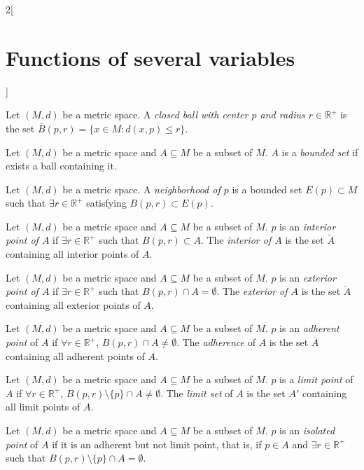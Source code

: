 \documentclass[../../../main.tex]{subfiles}
\begin{document}
\begin{multicols}{2}[\section{Functions of several variables}]
\begin{definition}
Let $(M,d)$ be a metric space. A \textit{closed ball with center $p$ and radius $r\in\mathbb{R}^+$} is the set $\overline{B}(p,r)=\{x\in M:d(x,p)\leq r\}$.
\end{definition}
\begin{definition}
Let $(M,d)$ be a metric space and $A\subseteq M$ be a subset of $M$. $A$ is a \textit{bounded set} if exists a ball containing it.
\end{definition}
\begin{definition}
Let $(M,d)$ be a metric space. A \textit{neighborhood of $p$} is a bounded set $E(p)\subset M$ such that $\exists r\in\mathbb{R}^+$ satisfying $B(p,r)\subset E(p)$.
\end{definition}
\begin{definition}
Let $(M,d)$ be a metric space and $A\subseteq M$ be a subset of $M$. $p$ is an \textit{interior point of $A$} if $\exists r\in\mathbb{R}^+$ such that $B(p,r)\subset A$. The \textit{interior of $A$} is the set $\mathring A$ containing all interior points of $A$.
\end{definition}
\begin{definition}
Let $(M,d)$ be a metric space and $A\subseteq M$ be a subset of $M$. $p$ is an \textit{exterior point of $A$} if $\exists r\in\mathbb{R}^+$ such that $B(p,r)\cap A=\emptyset$. The \textit{exterior of $A$} is the set $\mathring A$ containing all exterior points of $A$.
\end{definition}
\begin{definition}
Let $(M,d)$ be a metric space and $A\subseteq M$ be a subset of $M$. $p$ is an \textit{adherent point} of $A$ if $\forall r\in\mathbb{R}^+$, $B(p,r)\cap A\ne\emptyset$. The \textit{adherence} of $A$ is the set $\overline{A}$ containing all adherent points of $A$.
\end{definition}
\begin{definition}
Let $(M,d)$ be a metric space and $A\subseteq M$ be a subset of $M$. $p$ is a \textit{limit point} of $A$ if $\forall r\in\mathbb{R}^+$, $B(p,r)\setminus\{p\}\cap A\ne\emptyset$. The \textit{limit set} of $A$ is the set $A'$ containing all limit points of $A$.
\end{definition}
\begin{definition}
Let $(M,d)$ be a metric space and $A\subseteq M$ be a subset of $M$. $p$ is an \textit{isolated point} of $A$ if it is an adherent but not limit point, that is, if $p\in A$ and $\exists r\in\mathbb{R}^+$ such that $B(p,r)\setminus\{p\}\cap A=\emptyset$.
\end{definition}

\end{multicols}
\end{document}
